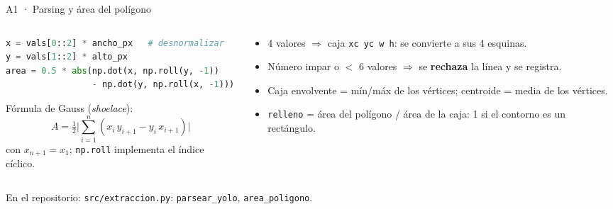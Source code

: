\documentclass[aspectratio=169,10pt]{beamer}
\begin{document}
\begin{frame}[fragile]{A1 · Parsing y área del polígono}
  \begin{columns}[T]
    \begin{column}{0.55\textwidth}
\begin{lstlisting}[language=Python]
x = vals[0::2] * ancho_px   # desnormalizar
y = vals[1::2] * alto_px
area = 0.5 * abs(np.dot(x, np.roll(y, -1))
                 - np.dot(y, np.roll(x, -1)))
\end{lstlisting}
      \vspace{1ex}
      \small Fórmula de Gauss (\emph{shoelace}):
      \[ A = \tfrac{1}{2}\Big|\textstyle\sum_{i=1}^{n} (x_i\,y_{i+1} - y_i\,x_{i+1})\Big| \]
      con $x_{n+1} = x_1$; \texttt{np.roll} implementa el índice cíclico.
    \end{column}
    \begin{column}{0.42\textwidth}
      \small
      \begin{itemize}\setlength{\itemsep}{0.5ex}
        \item 4 valores $\Rightarrow$ caja \texttt{xc yc w h}: se convierte a sus 4 esquinas.
        \item Número impar o $<$ 6 valores $\Rightarrow$ se \textbf{rechaza} la línea y se registra.
        \item Caja envolvente = mín/máx de los vértices; centroide = media de los vértices.
        \item \texttt{relleno} = área del polígono / área de la caja: 1 si el contorno es un rectángulo.
      \end{itemize}
    \end{column}
  \end{columns}
  \vfill{\scriptsize\color{gris}En el repositorio: \texttt{src/extraccion.py}: \texttt{parsear\_yolo}, \texttt{area\_poligono}.}
\end{frame}
\end{document}

